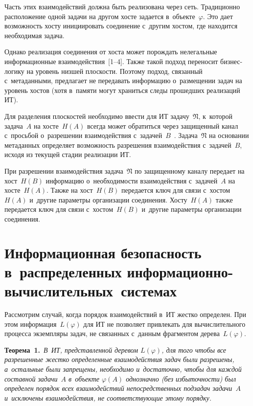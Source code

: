 \begin{multicols}{2}
  Часть этих взаимодействий должна быть реализована через сеть. Традиционно 
расположение одной задачи на другом хос\-те задается в~объекте~$\varphi$. Это 
дает воз\-мож\-ность хос\-ту инициировать соединение с~другим хос\-том, где находится 
необходимая задача. 
  
  Однако реализация соединения от хоста может порождать нелегальные 
информационные взаимодействия~[1--4]. Также такой подход переносит 
биз\-нес-ло\-ги\-ку на уровень низ\-шей плос\-кости. Поэтому подход, связанный с~метаданными, 
предлагает не передавать информацию о~размещении задач  на уровень хостов 
(хотя в~памяти могут храниться следы прошедших реализаций ИТ). 
  
  Для разделения плоскостей необходимо ввес\-ти для ИТ задачу~$\mathfrak{N}$, 
  к~которой задача~$A$ на хосте~$H(A)$ всегда может обратиться
  через защищенный 
канал  с~прось\-бой о~разрешении взаимодействия 
с~задачей~$B$~\cite{1-gr}. Задача~$\mathfrak{N}$ на основании метаданных определяет 
возможность разрешения взаимодействия с~задачей~$B$, исходя из текущей 
стадии реализации ИТ. 
  
  При разрешении взаимодействия задача~$\mathfrak{N}$ по защищенному 
каналу передает на хост~$H(B)$ информацию о~не\-об\-хо\-ди\-мости взаимодействия 
с~задачей~$A$ на хосте~$H(A)$. Так\-же на хост~$H(B)$ передается ключ для 
связи с~хостом~$H(A)$ и~другие па\-ра\-мет\-ры организации соединения. 
Хос\-ту~$H(A)$ также передается ключ для связи с~хостом~$H(B)$ и~другие 
па\-ра\-мет\-ры организации соединения.

\vspace*{-6pt}
  
\section{Информационная безопасность в~распределенных
информационно-вычислительных~системах}

  Рассмотрим случай, когда порядок взаимодействий в~ИТ жест\-ко определен. При 
этом информация~$L(\varphi)$ для ИТ не позволяет привлекать для 
вы\-чис\-ли\-тель\-но\-го процесса экземпляры задач, не связанных с~данным фрагментом 
дерева~$L(\varphi)$.
  
  \smallskip
  
  \noindent
  \textbf{Теорема~1.}\ \textit{В~ИТ, пред\-став\-лен\-ной деревом $L(\varphi)$, для 
того чтобы все разрешенные жест\-ко определенные взаимодействия задач были 
разрешены, а~остальные были запрещены, необходимо и~до\-ста\-точ\-но, чтобы для 
каждой со\-став\-ной задачи~$A$ в~объекте $\varphi(A)$ однозначно (без 
из\-бы\-точ\-ности) был определен порядок всех взаимодействий непосредственных 
подзадач задачи~$A$ и~исключены взаимодействия, не со\-от\-вет\-ст\-ву\-ющие этому 
порядку.}
  

\end{multicols}
